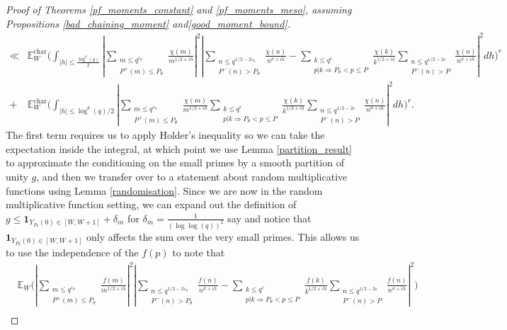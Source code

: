 \documentclass[reqno]{amsart}
\theoremstyle{definition}
\theoremstyle{remark}
\numberwithin{equation}{section}
\theoremstyle{remark}
\begin{document}
\begin{proof}[Proof of Theorems \ref{pf_moments_constant} and \ref{pf_moments_meso}, assuming Propositions \ref{bad_chaining_moment} and\ref{good_moment_bound}]
\begin{align*}
        \ll& \mathbb{E}_W^{\text{char}}\big(\int_{|h| \leq \frac{\log^\theta(q)}{2}}|\sum_{\substack{m \leq q^{\varepsilon_\theta} \\ P^+(m) \leq P_\theta}}\frac{\chi(m)}{m^{1/2+ih}}|^2|\sum_{\substack{n \leq q^{1/2-2\varepsilon_\theta} \\ P^{-}(n) >P_\theta}}\frac{\chi(n)}{n^{\sigma+ih}}-\sum_{\substack{k \leq q^{\varepsilon} \\ p|k \Rightarrow P_\theta < p \leq P}}\frac{\chi(k)}{k^{1/2+ih}}\sum_{\substack{n \leq q^{1/2-2\varepsilon} \\ P^{-}(n) > P}}\frac{\chi(n)}{n^{\sigma+ih}}|^2dh\big)^r \\
        +& \mathbb{E}_W^{\text{char}}\big(\int_{|h| \leq \log^\theta(q)/2}|\sum_{\substack{m \leq q^{\varepsilon_\theta} \\ P^+(m) \leq P_\theta}}\frac{\chi(m)}{m^{1/2+ih}}\sum_{\substack{k \leq q^{\varepsilon} \\ p|k \Rightarrow P_\theta < p \leq P}}\frac{\chi(k)}{k^{1/2+ih}}\sum_{\substack{n \leq q^{1/2-2\varepsilon} \\ P^{-}(n) > P}}\frac{\chi(n)}{n^{\sigma+ih}}|^2dh\big)^r.
    \end{align*}
    The first term requires us to apply Holder's inequality so we can take the expectation inside the integral, at which point we use Lemma \ref{partition_result} to approximate the conditioning on the small primes by a smooth partition of unity $g$, and then we transfer over to a statement about random multiplicative functions using Lemma \ref{randomisation}. Since we are now in the random multiplicative function setting, we can expand out the definition of $g \leq \mathbf{1}_{Y_{P_\theta}(0) \in [W,W+1]}+\delta_m$ for $\delta_m = \frac{1}{(\log\log(q))^2}$ say and notice that $\mathbf{1}_{Y_{P_\theta}(0) \in [W,W+1]}$ only affects the sum over the very small primes. This allows us to use the independence of the $f(p)$ to note that
    \begin{equation*}\begin{split}
        &\mathbb{E}_W\big(|\sum_{\substack{m \leq q^{\varepsilon_\theta} \\ P^+(m) \leq P_\theta}}\frac{f(m)}{m^{1/2+ih}}|^2|\sum_{\substack{n \leq q^{1/2-2\varepsilon_\theta} \\ P^{-}(n) >P_\theta}}\frac{f(n)}{n^{\sigma+ih}}-\sum_{\substack{k \leq q^{\varepsilon} \\ p|k \Rightarrow P_\theta < p \leq P}}\frac{f(k)}{k^{1/2+ih}}\sum_{\substack{n \leq q^{1/2-2\varepsilon} \\ P^{-}(n) > P}}\frac{f(n)}{n^{\sigma+ih}}|^2\big) \\

\end{split}
\end{equation*}
\end{proof}
\end{document}
